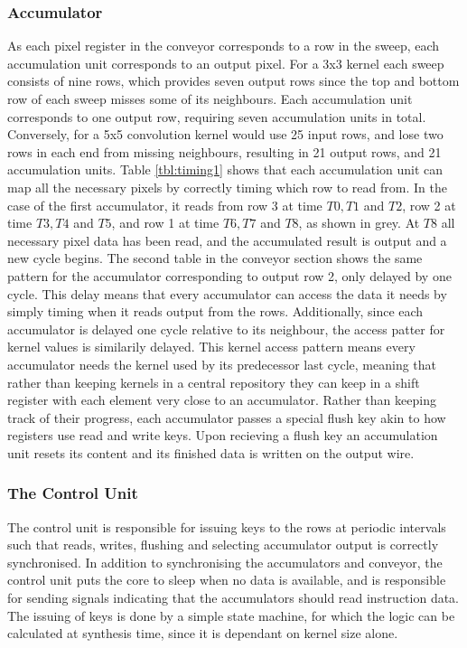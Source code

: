 \subsubsection{Accumulator}
As each pixel register in the conveyor corresponds to a row in the sweep, each accumulation unit corresponds to an output pixel.
For a 3x3 kernel each sweep consists of nine rows, which provides seven output rows since the top and bottom row of each sweep misses some of its neighbours.
Each accumulation unit corresponds to one output row, requiring seven accumulation units in total.\\
Conversely, for a 5x5 convolution kernel would use 25 input rows, and lose two rows in each end from missing neighbours, resulting in 21 output rows, and 21 accumulation units.
Table \ref{tbl:timing1} shows that each accumulation unit can map all the necessary pixels by correctly timing which row to read from.
In the case of the first accumulator, it reads from row 3 at time $T0, T1$ and $T2$, row 2 at time $T3, T4$ and $T5$, and row 1 at time $T6, T7$ and $T8$, as shown in grey.
At $T8$ all necessary pixel data has been read, and the accumulated result is output and a new cycle begins.
The second table in the conveyor section shows the same pattern for the accumulator corresponding to output row 2, only delayed by one cycle.
This delay means that every accumulator can access the data it needs by simply timing when it reads output from the rows.
Additionally, since each accumulator is delayed one cycle relative to its neighbour, the access patter for kernel values is similarily delayed.
This kernel access pattern means every accumulator needs the kernel used by its predecessor last cycle, meaning that rather than keeping kernels in a central repository they can keep in a shift register with each element very close to an accumulator.
Rather than keeping track of their progress, each accumulator passes a special flush key akin to how registers use read and write keys. Upon recieving a flush key an accumulation unit resets its content and its finished data is written on the output wire.

\subsubsection{The Control Unit}
The control unit is responsible for issuing keys to the rows at periodic intervals such that reads, writes, flushing and selecting accumulator output is correctly synchronised.
In addition to synchronising the accumulators and conveyor, the control unit puts the core to sleep when no data is available, and is responsible for sending signals indicating that the accumulators should read instruction data.
The issuing of keys is done by a simple state machine, for which the logic can be calculated at synthesis time, since it is dependant on kernel size alone. 

